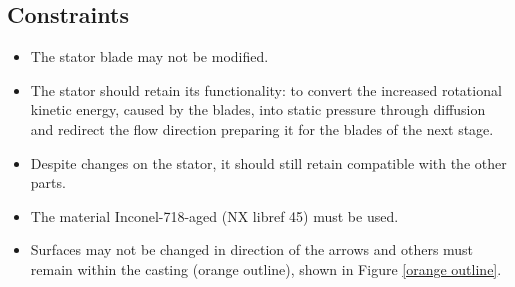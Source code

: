 \subsection*{Constraints}
\begin{itemize}
\item The stator blade may not be modified.
\item The stator should retain its functionality: to convert the increased rotational kinetic energy, caused by the blades, into static pressure through diffusion and redirect the flow direction preparing it for the blades of the next stage. 
\item Despite changes on the stator, it should still retain compatible with the other parts.
\item The material Inconel-718-aged (NX libref 45) must be used.
\item Surfaces may not be changed in direction of the arrows and others must remain within the casting (orange outline), shown in Figure \ref{orange outline}.
\end{itemize}
